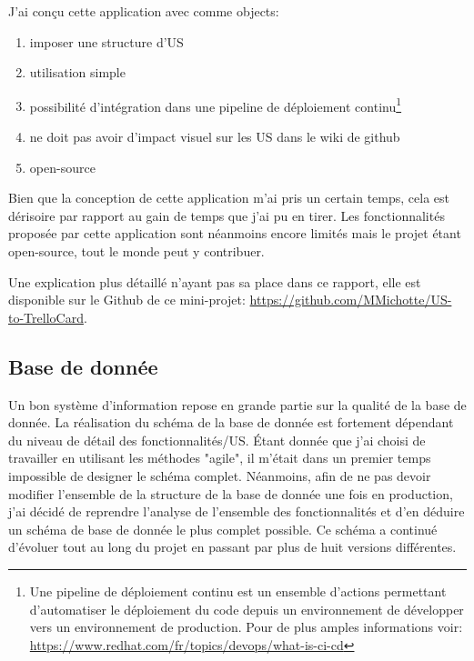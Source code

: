 \newpara

J'ai conçu cette application avec comme objects: 
\begin{enumerate}
  \item imposer une structure d'US
  \item utilisation simple
  \item possibilité d'intégration dans une pipeline de déploiement continu\footnote{Une pipeline de déploiement continu est un ensemble d'actions permettant d'automatiser le déploiement du code depuis un environnement de développer vers un environnement de production. Pour de plus amples informations voir: \url{https://www.redhat.com/fr/topics/devops/what-is-ci-cd}}
  \item ne doit pas avoir d'impact visuel sur les US dans le wiki de github
  \item open-source
\end{enumerate}

\newpara

Bien que la conception de cette application m'ai pris un certain temps, cela est dérisoire par rapport au gain de temps que j'ai pu en tirer. Les fonctionnalités proposée par cette application sont néanmoins encore limités mais le projet étant open-source, tout le monde peut y contribuer. 

\newpara

Une explication plus détaillé n'ayant pas sa place dans ce rapport, elle est disponible sur le Github de ce mini-projet: \url{https://github.com/MMichotte/US-to-TrelloCard}.


\subsection{Base de donnée}
Un bon système d'information repose en grande partie sur la qualité de la base de donnée.  
La réalisation du schéma de la base de donnée est fortement dépendant du niveau de détail des fonctionnalités/US. Étant donnée que j'ai choisi de travailler en utilisant les méthodes "agile", il m'était dans un premier temps impossible de designer le schéma complet. Néanmoins, afin de ne pas devoir modifier l'ensemble de la structure de la base de donnée une fois en production, j'ai décidé de reprendre l'analyse de l'ensemble des fonctionnalités et d'en déduire un schéma de base de donnée le plus complet possible. Ce schéma a continué d'évoluer tout au long du projet en passant par plus de huit versions différentes.

\newpara

